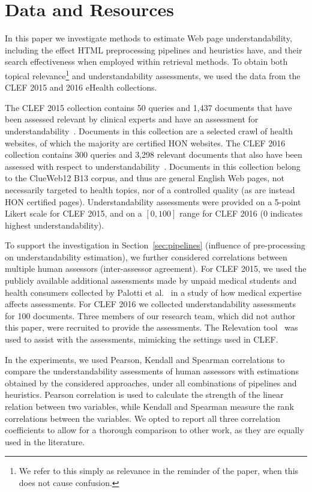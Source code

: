 \section{Data and Resources}
\label{sec:data}

In this paper we investigate methods to estimate Web page understandability, including the effect HTML preprocessing pipelines and heuristics have, and their search effectiveness when employed within retrieval methods. To obtain both topical relevance\footnote{We refer to this simply as relevance in the reminder of the paper, when this does not cause confusion.} and  understandability assessments, we used the data from the CLEF 2015 and 2016 eHealth collections. 

The CLEF 2015 collection contains 50 queries and 1,437 documents that have been assessed relevant by clinical experts and have an assessment for understandability~\cite{clef15}. Documents in this collection are a selected crawl of health websites, of which the majority are certified HON websites.
The CLEF 2016 collection contains 300 queries and 3,298 relevant documents that also have been assessed with respect to understandability~\cite{clef16}. Documents in this collection belong to the ClueWeb12 B13 corpus, and thus are general English Web pages, not necessarily targeted to health topics, nor of a controlled quality (as are instead HON certified pages). 
Understandability assessments were provided on a 5-point Likert scale for CLEF 2015, and on a $[0,100]$ range for CLEF 2016 (0 indicates highest understandability). 

To support the investigation in Section~\ref{sec:pipelines} (influence of pre-processing on understandability estimation), we further considered correlations between multiple human assessors (inter-assessor agreement). For CLEF 2015, we used the publicly available additional assessments made by unpaid medical students and health consumers collected by Palotti et al.~\cite{palotti16b} in a study of how medical expertise affects assessments. For CLEF 2016 we  collected understandability assessments for 100 documents. Three members of our research team, which did not author this paper, were recruited to provide the assessments. The Relevation tool~\cite{koopman14} was used to assist with the assessments, mimicking the settings used in CLEF.

In the experiments, we used Pearson, Kendall and Spearman correlations to compare the understandability assessments of human assessors with estimations obtained by the considered approaches, under all combinations of pipelines and heuristics. Pearson correlation is used to calculate the strength of the linear relation between two variables, while Kendall and Spearman measure the rank correlations between the variables. We opted to report all three correlation coefficients to allow for a thorough comparison to other work, as they are equally used in the literature. 

